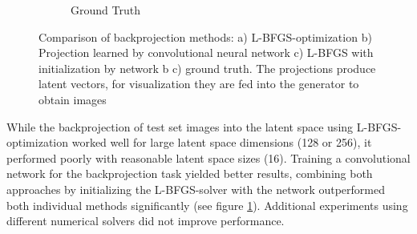 \documentclass[10pt,twocolumn,letterpaper]{article}
\begin{document}
\begin{figure}[]
\begin{subfigure}[b]{0.11\textwidth}
		\caption{Ground Truth}
	\end{subfigure}
	\caption{Comparison of backprojection methods: a) L-BFGS-optimization b) Projection learned by convolutional neural network c) L-BFGS with initialization by network b c) ground truth. The projections produce latent vectors, for visualization they are fed into the generator to obtain images}
	\label{fig:backprojection}
\end{figure}

While the backprojection of test set images into the latent space using L-BFGS-optimization worked well for large latent space dimensions (128 or 256), it performed poorly with reasonable latent space sizes (16). Training a convolutional network for the backprojection task yielded better results, combining both approaches by initializing the L-BFGS-solver with the network outperformed both individual methods significantly (see figure \ref{fig:backprojection}). Additional experiments using different numerical solvers did not improve performance.
\end{document}
